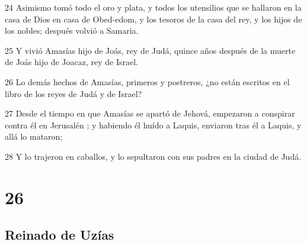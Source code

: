 \par 24 Asimismo tomó todo el oro y plata, y todos los utensilios que se hallaron en la casa de Dios en casa de Obed-edom, y los tesoros de la casa del rey, y los hijos de los nobles; después volvió a Samaria.
\par 25 Y vivió Amasías hijo de Joás, rey de Judá, quince años después de la muerte de Joás hijo de Joacaz, rey de Israel.
\par 26 Lo demás hechos de Amasías, primeros y postreros, ¿no están escritos en el libro de los reyes de Judá y de Israel?
\par 27 Desde el tiempo en que Amasías se apartó de Jehová, empezaron a conspirar contra él en Jerusalén ; y habiendo él huído a Laquis, enviaron tras él a Laquis, y allá lo mataron;
\par 28 Y lo trajeron en caballos, y lo sepultaron con sus padres en la ciudad de Judá.

\chapter{26}

\section*{Reinado de Uzías}

